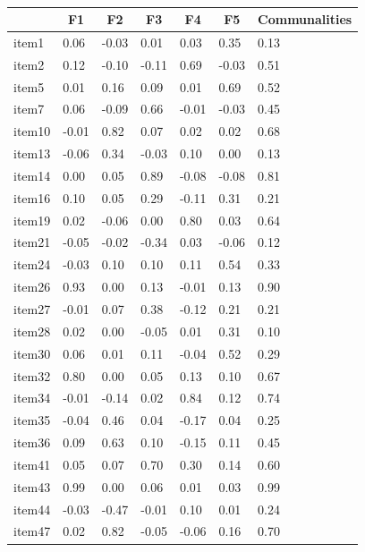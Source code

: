 \documentclass[
  english,
  man]{apa6}
\begin{document}
\begin{table}[tbp]

\begin{center}
\begin{threeparttable}

\caption{\label{tab:TabEFA5}}

\begin{tabular}{lllllll}
\toprule
 & \multicolumn{1}{c}{F1} & \multicolumn{1}{c}{F2} & \multicolumn{1}{c}{F3} & \multicolumn{1}{c}{F4} & \multicolumn{1}{c}{F5} & \multicolumn{1}{c}{Communalities}\\
\midrule
item1 & 0.06 & -0.03 & 0.01 & 0.03 & 0.35 & 0.13\\
item2 & 0.12 & -0.10 & -0.11 & 0.69 & -0.03 & 0.51\\
item5 & 0.01 & 0.16 & 0.09 & 0.01 & 0.69 & 0.52\\
item7 & 0.06 & -0.09 & 0.66 & -0.01 & -0.03 & 0.45\\
item10 & -0.01 & 0.82 & 0.07 & 0.02 & 0.02 & 0.68\\
item13 & -0.06 & 0.34 & -0.03 & 0.10 & 0.00 & 0.13\\
item14 & 0.00 & 0.05 & 0.89 & -0.08 & -0.08 & 0.81\\
item16 & 0.10 & 0.05 & 0.29 & -0.11 & 0.31 & 0.21\\
item19 & 0.02 & -0.06 & 0.00 & 0.80 & 0.03 & 0.64\\
item21 & -0.05 & -0.02 & -0.34 & 0.03 & -0.06 & 0.12\\
item24 & -0.03 & 0.10 & 0.10 & 0.11 & 0.54 & 0.33\\
item26 & 0.93 & 0.00 & 0.13 & -0.01 & 0.13 & 0.90\\
item27 & -0.01 & 0.07 & 0.38 & -0.12 & 0.21 & 0.21\\
item28 & 0.02 & 0.00 & -0.05 & 0.01 & 0.31 & 0.10\\
item30 & 0.06 & 0.01 & 0.11 & -0.04 & 0.52 & 0.29\\
item32 & 0.80 & 0.00 & 0.05 & 0.13 & 0.10 & 0.67\\
item34 & -0.01 & -0.14 & 0.02 & 0.84 & 0.12 & 0.74\\
item35 & -0.04 & 0.46 & 0.04 & -0.17 & 0.04 & 0.25\\
item36 & 0.09 & 0.63 & 0.10 & -0.15 & 0.11 & 0.45\\
item41 & 0.05 & 0.07 & 0.70 & 0.30 & 0.14 & 0.60\\
item43 & 0.99 & 0.00 & 0.06 & 0.01 & 0.03 & 0.99\\
item44 & -0.03 & -0.47 & -0.01 & 0.10 & 0.01 & 0.24\\
item47 & 0.02 & 0.82 & -0.05 & -0.06 & 0.16 & 0.70\\
\bottomrule
\end{tabular}

\end{threeparttable}
\end{center}

\end{table}
\end{document}
